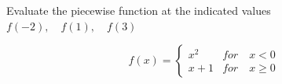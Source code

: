 \documentclass[11pt]{exam}
\begin{document}
\begin{questions}

\vspace{8cm}
\newpage
\addpoints
\question[10] Evaluate the piecewise function at the indicated values $f(-2), \quad f(1), \quad f(3)$
\begin{center}
	\[f(x)= \begin{cases} 
	x^2 & for \quad  x< 0 \\
	x+1 & for \quad x\geq 0 
	\end{cases}
	\]
\end{center}
 


\end{questions}
\end{document}
